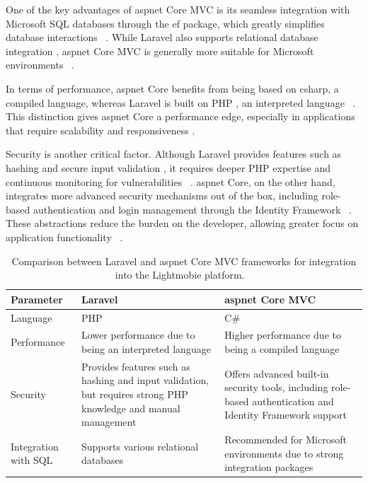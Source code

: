 One of the key advantages of \ac{aspnet} Core \ac{MVC} is its seamless integration with Microsoft \ac{SQL} databases through the \ac{ef} package, which greatly simplifies database interactions ~\cite{Mezei_2023}. While Laravel also supports relational database integration \cite{Sinha_2016}, \ac{aspnet} Core \ac{MVC} is generally more suitable for Microsoft environments ~\cite{asp_net_vs_laravel}.

In terms of performance, \ac{aspnet} Core benefits from being based on \ac{csharp}, a compiled language, whereas Laravel is built on \acs{PHP} , an interpreted language ~\cite{Yang_2023}. This distinction gives \ac{aspnet} Core a performance edge, especially in applications that require scalability and responsiveness \cite{Limon_2025}.

Security is another critical factor. Although Laravel provides features such as hashing and secure input validation \cite{Mary__2021} , it requires deeper \acs{PHP}  expertise and continuous monitoring for vulnerabilities ~\cite{asp_net_vs_laravel}. \ac{aspnet} Core, on the other hand, integrates more advanced security mechanisms out of the box, including role-based authentication and login management through the Identity Framework ~\cite{Pranaya_Rout_2025}. These abstractions reduce the burden on the developer, allowing greater focus on application functionality ~\cite{asp_net_vs_laravel}.

\begin{table}[]
\begin{tabular}{| m{5em} | m{15em} | m{15em} |}
\hline
Parameter & Laravel & \ac{aspnet} Core \ac{MVC} \\
\hline
Language & \acs{PHP}  & C\# \\
\hline
Performance & Lower performance due to being an interpreted language & Higher performance due to being a compiled language \\
\hline 
Security & Provides features such as hashing and input validation, but requires strong \acs{PHP}  knowledge and manual management & Offers advanced built-in security tools, including role-based authentication and Identity Framework support \\
\hline
Integration with \ac{SQL} & Supports various relational databases & Recommended for Microsoft environments due to strong integration packages \\
\hline
\end{tabular}
\caption{Comparison between Laravel and \ac{aspnet} Core \ac{MVC} frameworks for integration into the Lightmobie platform. ~\cite{asp_net_vs_laravel} }
\label{table:architetcture_comparison}
\end{table}
 
